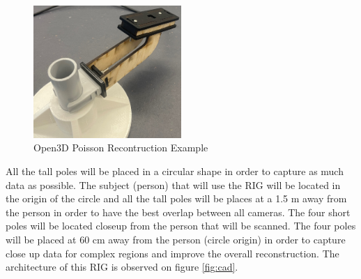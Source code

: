\documentclass[12pt]{report}
\begin{document}
\begin{figure}[H]
  \hspace*{0.8cm}  
  \includegraphics[width=0.5\textwidth]{IMG_5896_cropped.jpg}
  \captionsetup{singlelinecheck = false, format= hang, justification=raggedright,  labelsep=space}
 \caption{Open3D Poisson Recontruction Example}
 \label{fig:short_pole} 
\end{figure}

All the tall poles will be placed in a circular shape in order to capture as much data as possible. 
The subject (person) that will use the RIG will be located in the origin of the circle and all the tall poles will be places at a 1.5 m away from the person in order to have the best overlap between all cameras.
The four short poles will be located closeup from the person that will be scanned. The four poles will be placed at 60 cm away from the person (circle origin) in order to capture close up data for complex regions and improve the overall reconstruction.
The architecture of this RIG is observed on figure \ref{fig:cad}.
\enlargethispage{\baselineskip}

\newpage
\end{document}
